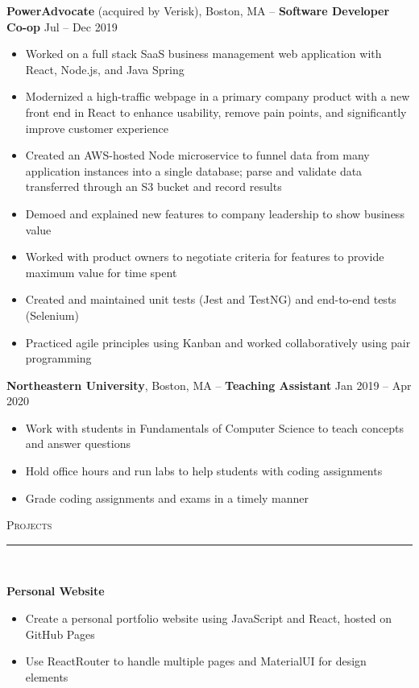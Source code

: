 \documentclass[11pt]{article}
\begin{document}
\begin{raggedright}
	
	\textbf{\large PowerAdvocate} (acquired by Verisk), Boston, MA -- \textbf{Software Developer Co-op}
	\hfill Jul -- Dec 2019 \\
		\begin{itemize}
			\item Worked on a full stack SaaS business management web application with React, Node.js, and Java Spring
			\item Modernized a high-traffic webpage in a primary company product with a new front end in React to enhance usability, remove pain points, and significantly improve customer experience
			\item Created an AWS-hosted Node microservice to funnel data from many application instances into a single database; parse and validate data transferred through an S3 bucket and record results
			\item Demoed and explained new features to company leadership to show business value
			\item Worked with product owners to negotiate criteria for features to provide maximum value for time spent
			\item Created and maintained unit tests (Jest and TestNG) and end-to-end tests (Selenium)
			\item Practiced agile principles using Kanban and worked collaboratively using pair programming
		\end{itemize}
	\vspace{0.1in}

	\textbf{\large Northeastern University}, Boston, MA -- \textbf{Teaching Assistant}
	\hfill Jan 2019 -- Apr 2020 \\
	\begin{itemize}
		\item Work with students in Fundamentals of Computer Science to teach concepts and answer questions
		\item Hold office hours and run labs to help students with coding assignments
		\item Grade coding assignments and exams in a timely manner
	\end{itemize}
	\vspace{0.1in}
	
	\textsc{\Large Projects} \\
	\vspace{-0.1in}
	\rule{\textwidth}{0.4pt} \\
	\vspace{0.05in}
	
	\textbf{\large Personal Website} 
	\begin{itemize}
		\item Create a personal portfolio website using JavaScript and React, hosted on GitHub Pages
		\item Use ReactRouter to handle multiple pages and MaterialUI for design elements
	\end{itemize}
	\vspace{0.1in}
	

\end{raggedright}
\end{document}
